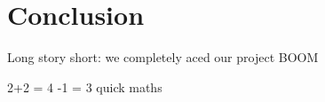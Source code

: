 \section{Conclusion}
     \pagestyle{mario}
     
Long story short: we completely aced our project BOOM

2+2 = 4 -1 = 3 quick maths